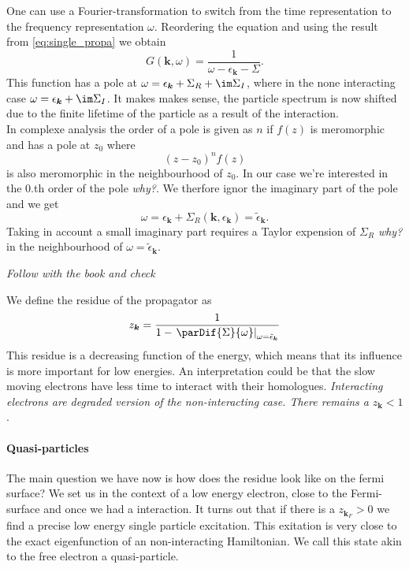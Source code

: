 \documentclass[../main.tex]{subfile}
\begin{document}
One can use a Fourier-transformation to switch from the time representation to the frequency representation $\omega$. Reordering the equation and using the result
from \ref{eq:single_propa} we obtain
\[
    G(\bm{k},\omega) = \frac{1}{\omega - \epsilon_{\bm{k}} - \Sigma}.
\]
This function has a pole at $\omega = \epsilon_{\bm{k}} + \Sigma_R + \im \Sigma_I$, where in the none interacting case $\omega = \epsilon_{\bm{k}} + \im\Sigma_I$.
It makes makes sense, the particle spectrum is now shifted due to the finite lifetime of the particle as a result of the interaction.\\

In complexe analysis the order of a pole is given as $n$ if $f(z)$ is meromorphic and has a pole at $z_0$ where
\[
    (z-z_0)^n f(z)
\]
is also meromorphic in the neighbourhood of $z_0$. In our case we're interested in the 0.th order of the pole \textit{why?}. 
We therfore ignor the imaginary part of the pole and we get
\[
    \omega = \epsilon_{\bm{k}} + \Sigma_R(\bm{k}, \epsilon_{\bm{k}}) = \tilde{\epsilon}_{\bm{k}}.  
\]
Taking in account a small imaginary part requires a Taylor expension of $\Sigma_{R}$ \textit{why?} in the neighbourhood of $\omega = \tilde{\epsilon}_{\bm{k}}$.
\begin{center}
    \textit{Follow with the book and check}
\end{center}
We define the residue of the propagator as 
\begin{equation}
    z_{\bm{k}} = \frac{1}{1- \left.\parDif{\Sigma}{\omega}\right|_{\omega = \tilde{\epsilon}_{\bm{k}}}} \label{eq:residue}
\end{equation}
This residue is a decreasing function of the energy, which means that its influence is more important for low energies. 
An interpretation could be that the slow moving electrons have less time to interact with their homologues. 
\textit{Interacting electrons are degraded version of the non-interacting case. There remains a} $z_{\bm{k}}<1$.\\ 

\paragraph{Quasi-particles}
The main question we have now is how does the residue look like on the fermi surface? We set us in the context of a low energy electron, close to the Fermi-surface and 
once we had a interaction. It turns out that if there is a $z_{\bm{k}_F}>0$ we find a precise low energy single particle excitation. This exitation is very close
to the exact eigenfunction of an non-interacting Hamiltonian. We call this state akin to the free electron a quasi-particle.\\
\end{document}
